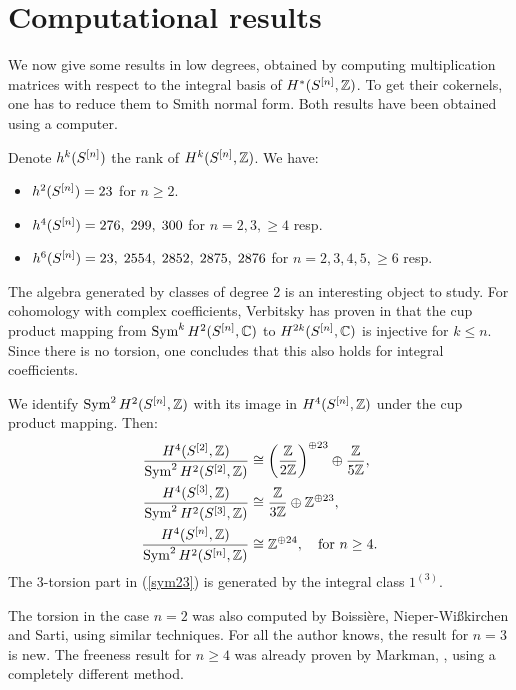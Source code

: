\section{Computational results} \label{CompSection}
We now give some results in low degrees, obtained by computing multiplication matrices with respect to the integral basis of $H^*(S^{[n]},\mathbb{Z})$. To get their cokernels, one has to reduce them to Smith normal form. Both results have been obtained using a computer.
\begin{remark}
Denote $h^k(S^{[n]})$ the rank of $H^k(S^{[n]},\mathbb{Z})$. We have:
\begin{itemize}
\item $h^2(S^{[n]}) = 23 $ for $n\geq 2$.
\item $h^4(S^{[n]}) = 276,\; 299,\; 300$ for $n=2,3, \geq 4$ resp.
\item $h^6(S^{[n]}) = 23,\; 2554,\; 2852,\; 2875,\; 2876$ for $n=2,3,4,5,\geq6$ resp.
\end{itemize}
\end{remark}
The algebra generated by classes of degree 2 is an interesting object to study. For cohomology with complex coefficients, Verbitsky has proven in \cite{Verbitsky} that the cup product mapping from $\operatorname{Sym}^k H^2(S^{[n]},\mathbb{C})$ to $H^{2k}(S^{[n]},\mathbb{C})$ is injective for $k\leq n$. Since there is no torsion, one concludes that this also holds for integral coefficients.
\begin{proposition} We identify $\operatorname{Sym}^2H^2(S^{[n]},\mathbb{Z})$ with its image in $H^4(S^{[n]},\mathbb{Z})$ under the cup product mapping. Then: 
\setcounter{equation}{0} 
\begin{align}
\frac{H^4(S^{[2]},\mathbb{Z})}{\operatorname{Sym}^2 H^2(S^{[2]},\mathbb{Z})} & \cong \left(\frac{\mathbb{Z}}{2\mathbb{Z}}\right)^{\oplus 23} \oplus \frac{\mathbb{Z}}{5\mathbb{Z}},\\
\label{sym23}
\frac{H^4(S^{[3]},\mathbb{Z})}{\operatorname{Sym}^2 H^2(S^{[3]},\mathbb{Z})} & \cong \frac{\mathbb{Z}}{3\mathbb{Z}} \oplus \mathbb{Z}^ {\oplus 23}, \\
\frac{H^4(S^{[n]},\mathbb{Z})}{\operatorname{Sym}^2 H^2(S^{[n]},\mathbb{Z})} & \cong  \mathbb{Z}^ {\oplus 24}, \quad \text{for }n\geq 4.
\end{align}
The 3-torsion part in (\ref{sym23}) is generated by the integral class $1^{(3)}$.
\end{proposition}
\begin{remark}
The torsion in the case $n=2$ was also computed by Boissi\`{e}re, Nieper-Wi\ss kirchen and Sarti, \cite[Prop. 3]{BNS} using similar techniques.
For all the author knows, the result for $n=3$ is new.
The freeness result for $n\geq 4$ was already proven by Markman, \cite[Thm. 1.10]{Markman2}, using a completely different method. 
\end{remark}
